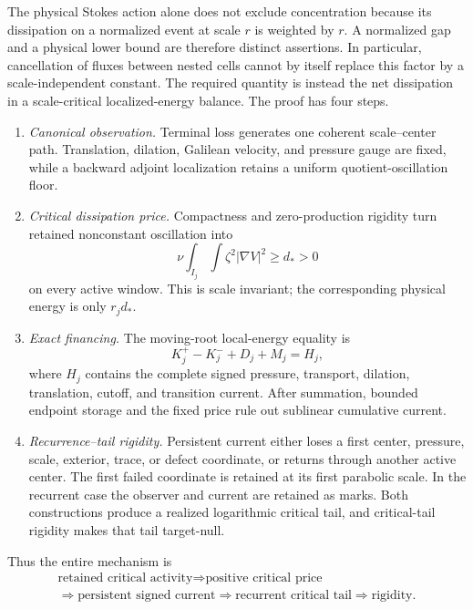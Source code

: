 \documentclass[11pt]{amsart}
\numberwithin{equation}{section}
\theoremstyle{plain}
\theoremstyle{definition}
\theoremstyle{remark}
\begin{document}
The physical Stokes action alone does not exclude concentration because its
dissipation on a normalized event at scale \(r\) is weighted by \(r\).  A normalized
gap and a physical lower bound are therefore distinct assertions.  In
particular, cancellation of fluxes between nested cells cannot by itself
replace this factor by a scale-independent constant.  The required quantity
is instead the net dissipation in a scale-critical localized-energy balance.
The proof has four steps.
\begin{enumerate}[label=\textup{\arabic*.},leftmargin=2.1em]
\item \emph{Canonical observation.}  Terminal loss generates one coherent
scale--center path.  Translation, dilation, Galilean velocity, and pressure
gauge are fixed, while a backward adjoint localization retains a uniform
quotient-oscillation floor.
\item \emph{Critical dissipation price.}  Compactness and zero-production
rigidity turn retained nonconstant oscillation into
\[
 \nu\int_{I_j}\int\zeta^2|\nabla V|^2\ge d_*>0
 \]
on every active window.  This is scale invariant; the corresponding physical
energy is only \(r_jd_*\).
\item \emph{Exact financing.}  The moving-root local-energy equality is
\[
 K_j^+-K_j^-+D_j+M_j=H_j,
 \]
where \(H_j\) contains the complete signed pressure, transport, dilation,
translation, cutoff, and transition current.  After summation, bounded
endpoint storage and the fixed price rule out sublinear cumulative current.
\item \emph{Recurrence--tail rigidity.}  Persistent current either loses a
first center, pressure, scale, exterior, trace, or defect coordinate, or
returns through another active center.  The first failed coordinate is
retained at its first parabolic scale.  In the recurrent case the observer
and current are retained as marks.  Both constructions produce a realized
logarithmic critical tail, and critical-tail rigidity makes that tail
target-null.
\end{enumerate}

Thus the entire mechanism is
\begin{equation}\label{eq:structural-proof-spine}
\boxed{\;
\begin{gathered}
\text{retained critical activity}
\Longrightarrow \text{positive critical price}\\
\Longrightarrow \text{persistent signed current}
\Longrightarrow \text{recurrent critical tail}
\Longrightarrow \text{rigidity}.
\end{gathered}
\;}
\end{equation}
\end{document}
